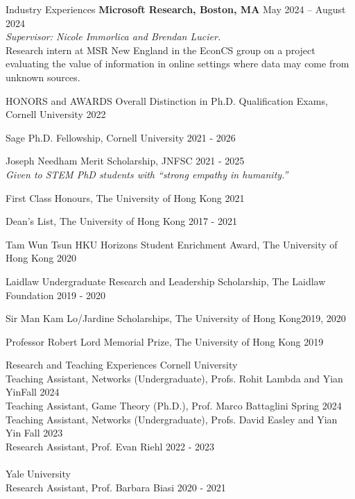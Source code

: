 \documentclass{resume} %
\begin{document}
\begin{rSection}{Industry Experiences}
  {\bf Microsoft Research, Boston, MA} \hfill {May 2024 -- August 2024} \\
  \emph{Supervisor: Nicole Immorlica and Brendan Lucier.}\\
  Research intern at MSR New England in the EconCS group on a project evaluating the value of information in online settings where data may come from unknown sources. 
  
\end{rSection}

\begin{rSection}{HONORS and AWARDS}
Overall Distinction in Ph.D. Qualification Exams, Cornell University \hfill 2022

Sage Ph.D. Fellowship, Cornell University \hfill 2021 - 2026

Joseph Needham Merit Scholarship, JNFSC \hfill 2021 - 2025 \\
\emph{Given to STEM PhD students with ``strong empathy in humanity.''}

First Class Honours, The University of Hong Kong \hfill 2021

Dean's List, The University of Hong Kong \hfill 2017 - 2021

Tam Wun Tsun HKU Horizons Student Enrichment Award, The University of Hong Kong \hfill 2020

Laidlaw Undergraduate Research and Leadership Scholarship, The Laidlaw Foundation \hfill 2019 - 2020

Sir Man Kam Lo/Jardine Scholarships, The University of Hong Kong\hfill 2019, 2020

Professor Robert Lord Memorial Prize, The University of Hong Kong \hfill 2019 

\end{rSection}


\begin{rSection}{Research and Teaching Experiences}
Cornell University \\
\-\hspace{1em} Teaching Assistant, Networks (Undergraduate), Profs. Rohit Lambda and Yian Yin\hfill Fall 2024 \\
\-\hspace{1em} Teaching Assistant, Game Theory (Ph.D.), Prof. Marco Battaglini \hfill Spring 2024 \\
\-\hspace{1em} Teaching Assistant, Networks (Undergraduate), Profs. David Easley and Yian Yin \hfill Fall 2023 \\
\-\hspace{1em} Research Assistant, Prof. Evan Riehl \hfill 2022 - 2023 \\
\\
Yale University \\
\-\hspace{1em} Research Assistant, Prof. Barbara Biasi \hfill 2020 - 2021
\end{rSection}
\end{document}
